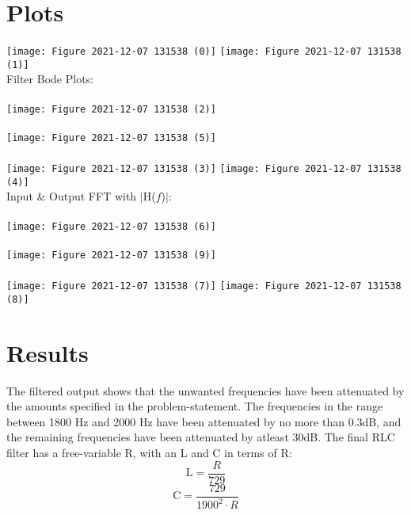 \documentclass[12pt]{report}
\begin{document}
\section{Plots}
\begin{center}
    \texttt{[image: Figure 2021-12-07 131538 (0)]}
    \texttt{[image: Figure 2021-12-07 131538 (1)]}\\
\pagebreak
Filter Bode Plots:\\~\\
    \texttt{[image: Figure 2021-12-07 131538 (2)]}\\~\\
    \texttt{[image: Figure 2021-12-07 131538 (5)]}\\~\\
    \texttt{[image: Figure 2021-12-07 131538 (3)]}
    \texttt{[image: Figure 2021-12-07 131538 (4)]}\\
\pagebreak
Input \& Output FFT with $|$H($f$)$|$:\\~\\
    \texttt{[image: Figure 2021-12-07 131538 (6)]}\\~\\
    \texttt{[image: Figure 2021-12-07 131538 (9)]}\\~\\
    \texttt{[image: Figure 2021-12-07 131538 (7)]}
    \texttt{[image: Figure 2021-12-07 131538 (8)]}\\
\end{center}

\section{Results}
The filtered output shows that the unwanted frequencies have been attenuated by the amounts specified in the problem-statement. The frequencies in the range between 1800 Hz and 2000 Hz have been attenuated by no more than 0.3dB, and the remaining frequencies have been attenuated by atleast 30dB. The final RLC filter has a free-variable R, with an L and C in terms of R:
\begin{equation}
    \text{L} = \frac{R}{729}
\end{equation}
\begin{equation}
    \text{C} = \frac{729}{1900^{2}\cdot R}
\end{equation}
\end{document}
